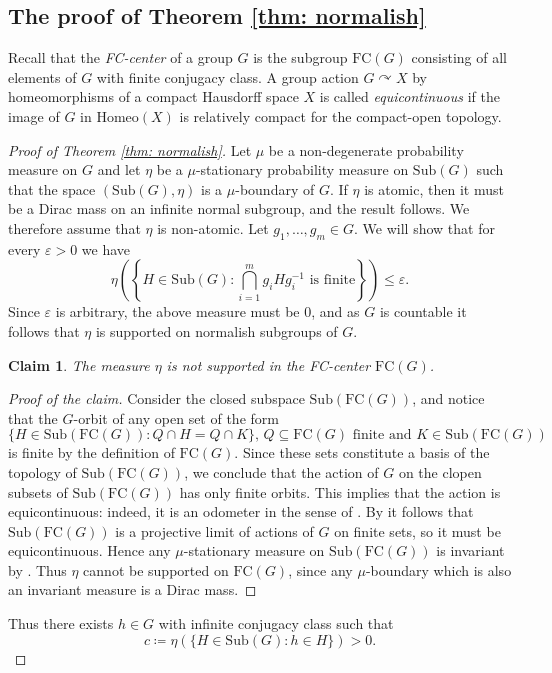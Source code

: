 \documentclass[reqno,a4paper,11pt]{amsart}
\numberwithin{equation}{section}
\newcommand{\1}{\mathbf{1}}
\newcommand{\sub}[1]{\mathrm{Sub}(#1)}
\newtheorem*{claim}{Claim}
\theoremstyle{definition}
\begin{document}
\subsection{The proof of Theorem \ref{thm: normalish}}
Recall that the \emph{FC-center} of a group $G$ is the subgroup $\mathrm{FC}(G)$ consisting of all elements of $G$ with finite conjugacy class. A group action $G \curvearrowright X$ by homeomorphisms of a compact Hausdorff space $X$ is called \emph{equicontinuous} if the image of $G$ in $\mathrm{Homeo}(X)$ is relatively compact for the compact-open topology.


\begin{proof}[Proof of Theorem \ref{thm: normalish}]
	Let $\mu$ be a non-degenerate probability measure on $G$ and let $\eta$ be a $\mu$-stationary probability measure on $\mathrm{Sub}(G)$ such that the space $(\sub{G},\eta)$ is a $\mu$-boundary of $G$. If $\eta$ is atomic, then it must be a Dirac mass on an infinite normal subgroup, and the result follows. We therefore assume that $\eta$ is non-atomic. Let $g_1, \ldots, g_m \in G$. We will show that for every $\varepsilon>0$ we have
	\begin{equation}\label{eq: normalish eps}
		\eta\left(\left\{ H \in \mathrm{Sub}(G) : \bigcap_{i=1}^m g_i Hg_i^{-1}\text{ is finite} \right\} \right)\le \varepsilon.
	\end{equation}
	Since $\varepsilon$ is arbitrary, the above measure must be $0$, and as $G$ is countable it follows that $\eta$ is supported on normalish subgroups of $G$.
	
	\begin{claim}
		The measure $\eta$ is not supported in the FC-center $\mathrm{FC}(G)$.
	\end{claim}
	\begin{proof}[Proof of the claim]
		Consider the closed subspace $\mathrm{Sub}(\mathrm{FC}(G))$, and notice that the $G$-orbit of any open set of the form 
		\[
		\{H \in \mathrm{Sub}(\mathrm{FC}(G)) : Q \cap H = Q \cap K\}, \, Q \subseteq \mathrm{FC}(G) \text{ finite and }K \in \mathrm{Sub}(\mathrm{FC}(G))
		\]
		is finite by the definition of $\mathrm{FC}(G)$. Since these sets constitute a basis of the topology of $\mathrm{Sub}(\mathrm{FC}(G))$, we conclude that the action of $G$ on the clopen subsets of $\mathrm{Sub}(\mathrm{FC}(G))$ has only finite orbits. This implies that the action is equicontinuous: indeed, it is an odometer in the sense of \cite[Définition 2.1.3]{Cornulier2014}. By \cite[Fait 2.1.4 (iii)]{Cornulier2014} it follows that $\mathrm{Sub}(\mathrm{FC}(G))$ is a projective limit of actions of $G$ on finite sets, so it must be equicontinuous. Hence any $\mu$-stationary measure on $\mathrm{Sub}(\mathrm{FC}(G))$ is invariant by \cite[Theorem 7.4]{FurstenbergGlasner2010}. Thus $\eta$ cannot be supported on $\mathrm{FC}(G)$, since any $\mu$-boundary which is also an invariant measure is a Dirac mass.
	\end{proof}
	Thus there exists $h \in G$ with infinite conjugacy class such that 
	\[
	c \coloneqq \eta(\{H \in \mathrm{Sub}(G): h \in H\})>0.
	\]
	

\end{proof}
\end{document}
